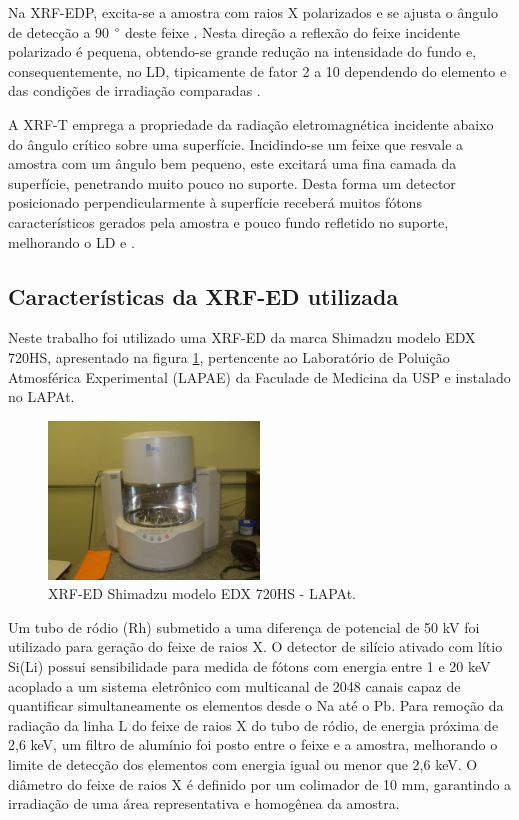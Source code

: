 Na XRF-EDP, excita-se a amostra com raios X polarizados e se ajusta o ângulo 
de detecção a 90 $\degree$ deste feixe \citep{dzubay1974}. Nesta direção a 
reflexão do feixe incidente polarizado é pequena, obtendo-se grande redução 
na intensidade do fundo e, consequentemente, no LD, tipicamente de fator 2 a 10
dependendo do elemento e das condições de irradiação comparadas 
\citep{meel2009}.

A XRF-T emprega a propriedade da radiação eletromagnética incidente abaixo do
ângulo crítico sobre uma superfície. Incidindo-se um feixe que resvale a amostra
com um ângulo bem pequeno, este excitará uma fina camada da superfície, 
penetrando muito pouco no suporte. Desta forma um detector posicionado 
perpendicularmente à superfície receberá muitos fótons característicos gerados 
pela amostra e pouco fundo refletido no suporte, melhorando o LD
\citep{yoneda1971} e \citep{aiginger1974}.

\subsection{Características da XRF-ED utilizada}

Neste trabalho foi utilizado uma XRF-ED da marca Shimadzu modelo EDX 720HS, 
apresentado na figura \ref{fig:xrfed_iag},
pertencente ao Laboratório de Poluição Atmosférica Experimental (LAPAE) 
da Faculade de Medicina da USP e instalado no LAPAt. 

\begin{figure}[H]
  \centering
  \includegraphics[width=0.5\textwidth]{../inputs/images/xrf-ed-IAG-USP.jpg}
  \caption{XRF-ED Shimadzu modelo EDX 720HS - LAPAt. \label{fig:xrfed_iag}}
\end{figure}

Um tubo de ródio (Rh) submetido a uma diferença de potencial 
de 50 kV foi utilizado para geração do feixe de raios X.
O detector de silício ativado com lítio Si(Li) possui sensibilidade
para medida de fótons com energia entre 1 e 20 keV acoplado a um sistema 
eletrônico com multicanal de 2048 canais capaz de quantificar simultaneamente 
os elementos desde o Na até o Pb. Para remoção da radiação da linha L do feixe 
de raios X do tubo de ródio, de energia próxima de 2,6 keV, um filtro de 
alumínio foi posto entre o feixe e a amostra, melhorando o limite de detecção 
dos elementos com energia igual ou menor que 2,6 keV. O diâmetro do feixe de 
raios X é definido por um colimador de 10 mm, garantindo a irradiação de uma 
área representativa e homogênea da amostra. 

